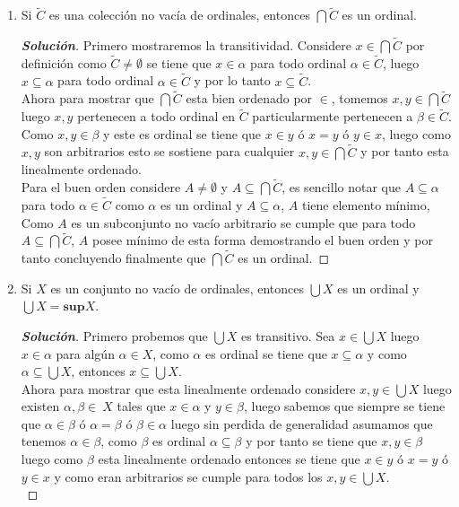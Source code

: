 \documentclass[11pt]{article}
\numberwithin{equation}{section}
\numberwithin{figure}{section}
\begin{document}
\begin{enumerate}
\begin{proof}[\textbf{Solución}]
    Ahora recordemos que $\beta\subseteq\alpha$, luego la relación $\in_\beta$ es una restricción de la relación $\in_\alpha$ por lo tanto como esta es un buen orden entonces $\in_\beta$ también es un buen orden probando de esta forma que $\beta$ es un ordinal y por lo tanto se demuestra la propiedad.
    \end{proof}
    \item Si $\tilde{C}$ es una colección no vacía de ordinales, entonces $\bigcap\tilde{C}$ es un ordinal.
    \begin{proof}[\textbf{Solución}]
    Primero mostraremos la transitividad. Considere $x\in\bigcap\tilde{C}$ por definición como $\tilde{C}\neq\emptyset$ se tiene que $x\in\alpha$ para todo ordinal $\alpha\in\tilde{C}$, luego $x\subseteq\alpha$ para todo ordinal $\alpha\in\tilde{C}$ y por lo tanto $x\subseteq\tilde{C}$.\\
    Ahora para mostrar que $\bigcap\tilde{C}$ esta bien ordenado por $\in$, tomemos $x,y\in\bigcap\tilde{C}$ luego $x,y$ pertenecen a todo ordinal en $\tilde{C}$ particularmente pertenecen a $\beta\in\tilde{C}$. Como $x,y\in\beta$ y este es ordinal se tiene que $x\in y$ ó $x=y$ ó $y\in x$, luego como $x,y$ son arbitrarios esto se sostiene para cualquier $x,y\in\bigcap\tilde{C}$ y por tanto esta linealmente ordenado.\\
    Para el buen orden considere $A\neq\emptyset$ y $A\subseteq\bigcap\tilde{C}$, es sencillo notar que $A\subseteq\alpha$ para todo $\alpha\in\tilde{C}$ como $\alpha$ es un ordinal y $A\subseteq\alpha$, $A$ tiene elemento mínimo, Como $A$ es un subconjunto no vacío arbitrario se cumple que para todo $A\subseteq\bigcap\tilde{C}$, $A$ posee mínimo de esta forma demostrando el buen orden y por tanto concluyendo finalmente que $\bigcap\tilde{C}$ es un ordinal.
    \end{proof}
    \item Si $X$ es un conjunto no vacío de ordinales, entonces $\bigcup X$ es un ordinal y $\bigcup X=\textbf{sup}X$.
    \begin{proof}[\textbf{Solución}]
    Primero probemos que $\bigcup X$ es transitivo. Sea $x\in\bigcup X$ luego $x\in\alpha$ para algún $\alpha\in X$, como $\alpha$ es ordinal se tiene que $x\subseteq\alpha$ y como $\alpha\subseteq\bigcup X$, entonces $x\subseteq\bigcup X$.\\
    Ahora para mostrar que esta linealmente ordenado considere $x,y\in\bigcup X$ luego existen $\alpha,\beta\in\ X$ tales que $x\in\alpha$ y $y\in\beta$, luego sabemos que siempre se tiene que $\alpha\in\beta$ ó $\alpha=\beta$ ó $\beta\in\alpha$ luego sin perdida de generalidad asumamos que tenemos $\alpha\in\beta$, como $\beta$ es ordinal $\alpha\subseteq\beta$ y por tanto se tiene que $x,y\in\beta$ luego como $\beta$ esta linealmente ordenado entonces se tiene que $x\in y$ ó $x=y$ ó $y\in x$ y como eran arbitrarios se cumple para todos los $x,y\in\bigcup X$.\\

\end{proof}
\end{enumerate}
\end{document}
